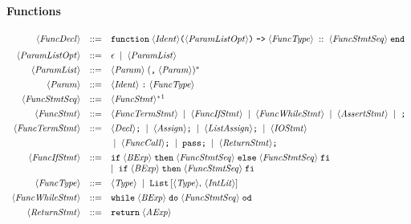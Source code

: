 \documentclass{article}
\begin{document}
\paragraph{Functions}
\[
\begin{array}{rcl}
\langle \mathit{FuncDecl} \rangle
&::=&
\mathtt{function}\;\langle \mathit{Ident} \rangle
\texttt{(}\langle \mathit{ParamListOpt} \rangle\texttt{)}
\;\texttt{->}\;
\langle \mathit{FuncType} \rangle\;
::\;
\langle \mathit{FuncStmtSeq} \rangle\;
\mathtt{end} \\[6pt]

\langle \mathit{ParamListOpt} \rangle
&::=&
\epsilon
\;\mid\;
\langle \mathit{ParamList} \rangle \\[4pt]

\langle \mathit{ParamList} \rangle
&::=&
\langle \mathit{Param} \rangle\;(\texttt{,}\;\langle \mathit{Param} \rangle)^* \\[4pt]

\langle \mathit{Param} \rangle
&::=&
\langle \mathit{Ident} \rangle\;\texttt{:}\;\langle \mathit{FuncType} \rangle 
\\[4pt]

\langle \mathit{FuncStmtSeq} \rangle
&::=&
\langle \mathit{FuncStmt} \rangle^*\footnotemark \\[4pt]

\langle \mathit{FuncStmt} \rangle
&::=&
\langle \mathit{FuncTermStmt} \rangle
\;\mid\;
\langle \mathit{FuncIfStmt} \rangle
\;\mid\;
\langle \mathit{FuncWhileStmt} \rangle
\;\mid\;
\langle \mathit{AssertStmt} \rangle
\;\mid\;
\texttt{;} \\[4pt]

\langle \mathit{FuncTermStmt} \rangle
&::=&
\langle \mathit{Decl} \rangle\texttt{;}
\;\mid\;
\langle \mathit{Assign} \rangle\texttt{;}
\;\mid\;
\langle \mathit{ListAssign} \rangle\texttt{;}
\;\mid\;
\langle \mathit{IOStmt} \rangle \\[4pt]
&& \;\mid\;
\langle \mathit{FuncCall} \rangle\texttt{;}
\;\mid\;
\mathtt{pass}\texttt{;}
\;\mid\;
\langle \mathit{ReturnStmt} \rangle\texttt{;}
\\[4pt]

\langle \mathit{FuncIfStmt} \rangle
&::=&
\mathtt{if}\;\langle \mathit{BExp} \rangle\;\mathtt{then}\;\langle \mathit{FuncStmtSeq} \rangle\;\mathtt{else}\;\langle \mathit{FuncStmtSeq} \rangle\;\mathtt{fi} \\
&& \mid\;
\mathtt{if}\;\langle \mathit{BExp} \rangle\;\mathtt{then}\;\langle \mathit{FuncStmtSeq} \rangle\;\mathtt{fi} \\[4pt]

\langle \mathit{FuncType} \rangle
&::=&
\langle \mathit{Type} \rangle
\;\mid\;
\mathtt{List}\,[\langle \mathit{Type} \rangle,\, \langle \mathit{IntLit} \rangle] \\[4pt]

\langle \mathit{FuncWhileStmt} \rangle
&::=&
\mathtt{while}\;\langle \mathit{BExp} \rangle\;\mathtt{do}\;\langle \mathit{FuncStmtSeq} \rangle\;\mathtt{od} \\[4pt]

\langle \mathit{ReturnStmt} \rangle
&::=&
\mathtt{return}\;\langle \mathit{AExp} \rangle

\end{array}
\]
\end{document}
